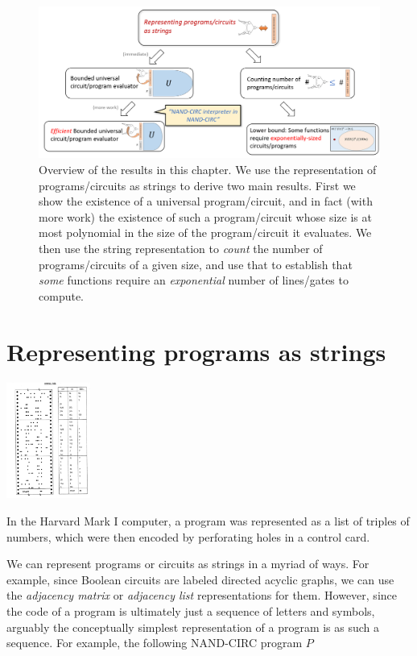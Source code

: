 \begin{figure}
\centering
\includegraphics[width=\textwidth, height=0.25\paperheight, keepaspectratio]{../figure/codedataoverview.png}
\caption{Overview of the results in this chapter. We use the
representation of programs/circuits as strings to derive two main
results. First we show the existence of a universal program/circuit, and
in fact (with more work) the existence of such a program/circuit whose
size is at most polynomial in the size of the program/circuit it
evaluates. We then use the string representation to \emph{count} the
number of programs/circuits of a given size, and use that to establish
that \emph{some} functions require an \emph{exponential} number of
lines/gates to compute.}
\label{codedataoverviewfig}
\end{figure}

\section{Representing programs as strings}\label{representprogramsec}


\begin{marginfigure}
\centering
\includegraphics[width=\linewidth, height=1.5in, keepaspectratio]{../figure/tapemarkI.png}
\caption{In the Harvard Mark I computer, a program was represented as a
list of triples of numbers, which were then encoded by perforating holes
in a control card.}
\label{markonerep}
\end{marginfigure}

We can represent programs or circuits as strings in a myriad of ways.
For example, since Boolean circuits are labeled directed acyclic graphs,
we can use the \emph{adjacency matrix} or \emph{adjacency list}
representations for them. However, since the code of a program is
ultimately just a sequence of letters and symbols, arguably the
conceptually simplest representation of a program is as such a sequence.
For example, the following NAND-CIRC program \(P\)

